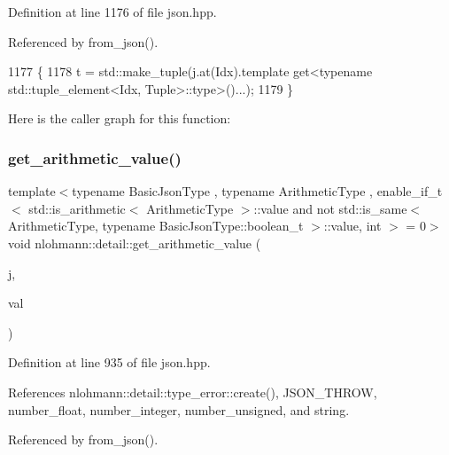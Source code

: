Definition at line 1176 of file json.\+hpp.



Referenced by from\+\_\+json().


\begin{DoxyCode}
1177 \{
1178     t = std::make\_tuple(j.at(Idx).template get<typename std::tuple\_element<Idx, Tuple>::type>()...);
1179 \}
\end{DoxyCode}
Here is the caller graph for this function\+:
\mbox{\label{namespacenlohmann_1_1detail_a85955b9c6dd31846e4b8e891f78614b6}} 
\subsubsection{\texorpdfstring{get\+\_\+arithmetic\+\_\+value()}{get\_arithmetic\_value()}}
{\footnotesize\ttfamily template$<$typename Basic\+Json\+Type , typename Arithmetic\+Type , enable\+\_\+if\+\_\+t$<$ std\+::is\+\_\+arithmetic$<$ Arithmetic\+Type $>$\+::value and not std\+::is\+\_\+same$<$ Arithmetic\+Type, typename Basic\+Json\+Type\+::boolean\+\_\+t $>$\+::value, int $>$  = 0$>$ \\
void nlohmann\+::detail\+::get\+\_\+arithmetic\+\_\+value (\begin{DoxyParamCaption}\item[{const Basic\+Json\+Type \&}]{j,  }\item[{Arithmetic\+Type \&}]{val }\end{DoxyParamCaption})}



Definition at line 935 of file json.\+hpp.



References nlohmann\+::detail\+::type\+\_\+error\+::create(), J\+S\+O\+N\+\_\+\+T\+H\+R\+OW, number\+\_\+float, number\+\_\+integer, number\+\_\+unsigned, and string.



Referenced by from\+\_\+json().


